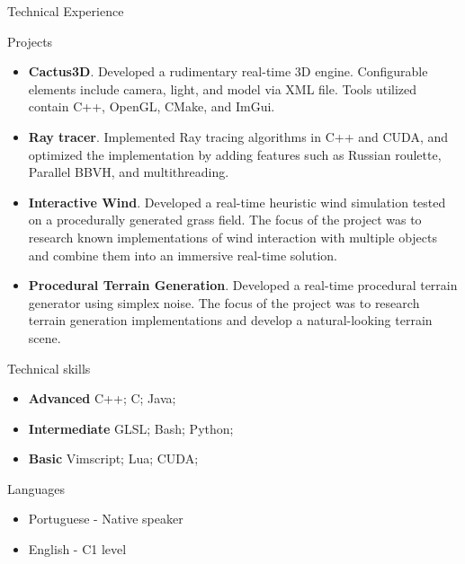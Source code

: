 \documentclass[]{mcdowellcv}
\begin{document}
	\begin{cvsection}{Technical Experience}
		\begin{cvsubsection}{Projects}{}{}
			\begin{itemize}
				\item \textbf{Cactus3D}. Developed a rudimentary real-time 3D engine. Configurable elements include camera, light, and model via XML file. Tools utilized contain C++, OpenGL, CMake, and ImGui.
				\item \textbf{Ray tracer}. Implemented Ray tracing algorithms in C++ and CUDA, and optimized the implementation by adding features such as Russian roulette, Parallel BBVH, and multithreading.
		               	\item \textbf{Interactive Wind}. Developed a real-time heuristic wind simulation tested on a procedurally generated grass field. The focus of the project was to research known implementations of wind interaction with multiple objects and combine them into an immersive real-time solution.
                		\item \textbf{Procedural Terrain Generation}. Developed a real-time procedural terrain generator using simplex noise. The focus of the project was to research terrain generation implementations and develop a natural-looking terrain scene.

			\end{itemize}
		\end{cvsubsection}
	\end{cvsection}

	\begin{cvsection}{Technical skills}
		\begin{cvsubsection}{}{}{}
			\begin{itemize}
				\item \textbf{Advanced} C++; C; Java;
				\item \textbf{Intermediate} GLSL; Bash; Python;
				\item \textbf{Basic} Vimscript; Lua; CUDA;
			\end{itemize}
		\end{cvsubsection}
	\end{cvsection}

	\begin{cvsection}{Languages}
		\begin{cvsubsection}{}{}{}
			\begin{itemize}
				\item Portuguese - Native speaker
				\item English - C1 level
			\end{itemize}
		\end{cvsubsection}
	\end{cvsection}
\end{document}
